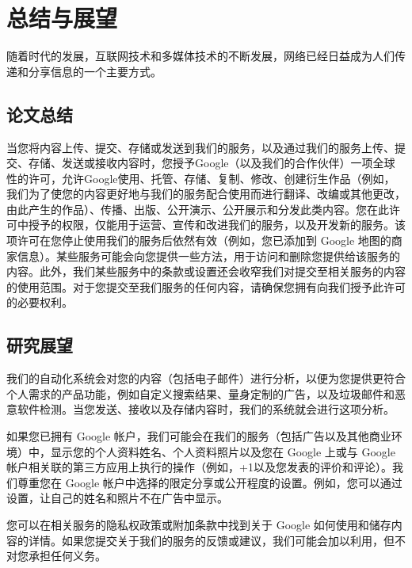 \chapter{总结与展望}

随着时代的发展，互联网技术和多媒体技术的不断发展，网络已经日益成为人们传递和分享信息的一个主要方式。

\section{论文总结}

当您将内容上传、提交、存储或发送到我们的服务，以及通过我们的服务上传、提交、存储、发送或接收内容时，您授予Google（以及我们的合作伙伴）一项全球性的许可，允许Google使用、托管、存储、复制、修改、创建衍生作品（例如，我们为了使您的内容更好地与我们的服务配合使用而进行翻译、改编或其他更改，由此产生的作品）、传播、出版、公开演示、公开展示和分发此类内容。您在此许可中授予的权限，仅能用于运营、宣传和改进我们的服务，以及开发新的服务。该项许可在您停止使用我们的服务后依然有效（例如，您已添加到 Google 地图的商家信息）。某些服务可能会向您提供一些方法，用于访问和删除您提供给该服务的内容。此外，我们某些服务中的条款或设置还会收窄我们对提交至相关服务的内容的使用范围。对于您提交至我们服务的任何内容，请确保您拥有向我们授予此许可的必要权利。

\section{研究展望}

我们的自动化系统会对您的内容（包括电子邮件）进行分析，以便为您提供更符合个人需求的产品功能，例如自定义搜索结果、量身定制的广告，以及垃圾邮件和恶意软件检测。当您发送、接收以及存储内容时，我们的系统就会进行这项分析。

如果您已拥有 Google 帐户，我们可能会在我们的服务（包括广告以及其他商业环境）中，显示您的个人资料姓名、个人资料照片以及您在 Google 上或与 Google 帐户相关联的第三方应用上执行的操作（例如，+1以及您发表的评价和评论）。我们尊重您在 Google 帐户中选择的限定分享或公开程度的设置。例如，您可以通过设置，让自己的姓名和照片不在广告中显示。

您可以在相关服务的隐私权政策或附加条款中找到关于 Google 如何使用和储存内容的详情。如果您提交关于我们的服务的反馈或建议，我们可能会加以利用，但不对您承担任何义务。